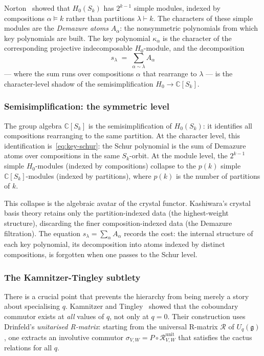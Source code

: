 Norton~\cite{norton-1979} showed that $H_0(S_k)$ has $2^{k-1}$ simple
modules, indexed by compositions $\alpha \models k$ rather than
partitions $\lambda \vdash k$.  The characters of these simple
modules are the \emph{Demazure atoms} $A_\alpha$: the nonsymmetric
polynomials from which key polynomials are built.  The key polynomial
$\kappa_\alpha$ is the character of the corresponding projective
indecomposable $H_0$-module, and the decomposition
\begin{equation}
\label{eq:key-schur}
  s_\lambda \;=\; \sum_{\alpha \sim \lambda} A_\alpha
\end{equation}
--- where the sum runs over compositions $\alpha$ that rearrange to
$\lambda$ --- is the character-level shadow of the semisimplification
$H_0 \to \mathbb{C}[S_k]$.

\subsubsection*{Semisimplification: the symmetric level}

The group algebra $\mathbb{C}[S_k]$ is the semisimplification of
$H_0(S_k)$: it identifies all compositions rearranging to the same
partition.  At the character level, this identification
is~\eqref{eq:key-schur}: the Schur polynomial is the sum of Demazure
atoms over compositions in the same $S_k$-orbit.  At the module level,
the $2^{k-1}$ simple $H_0$-modules (indexed by compositions) collapse
to the $p(k)$ simple $\mathbb{C}[S_k]$-modules (indexed by partitions),
where $p(k)$ is the number of partitions of $k$.

This collapse is the algebraic avatar of the crystal functor.
Kashiwara's crystal basis theory retains only the partition-indexed
data (the highest-weight structure), discarding the finer
composition-indexed data (the Demazure filtration).  The equation
$s_\lambda = \sum_\alpha A_\alpha$ records the cost: the internal
structure of each key polynomial, its decomposition into atoms indexed
by distinct compositions, is forgotten when one passes to the Schur
level.

\subsubsection*{The Kamnitzer-Tingley subtlety}

There is a crucial point that prevents the hierarchy from being merely
a story about specialising $q$.  Kamnitzer and
Tingley~\cite{kamnitzer-tingley-2007} showed that the coboundary
commutor exists at \emph{all} values of $q$, not only at $q = 0$.
Their construction uses Drinfeld's \emph{unitarised R-matrix}:
starting from the universal R-matrix $\mathcal{R}$ of $U_q(\mathfrak{g})$,
one extracts an involutive commutor
$\sigma_{V,W} = P \circ \mathcal{R}^{\mathrm{unit}}_{V,W}$ that
satisfies the cactus relations for all $q$.

